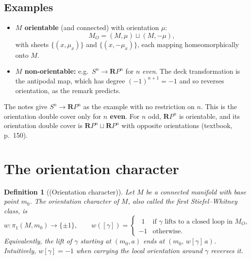 \documentclass[11pt]{article}
\newcommand{\RP}{\mathbf{R}P}
\newcommand{\MO}{M_O}
\theoremstyle{namedit}
\theoremstyle{namedrm}
\newtheorem{defn}{Definition}
\begin{document}
\subsection{Examples}
\begin{itemize}
  \item \textbf{$M$ orientable} (and connected) with orientation $\mu$:
        \[ \MO=(M,\mu)\sqcup(M,-\mu), \]
        with sheets $\{(x,\mu_x)\}$ and $\{(x,-\mu_x)\}$, each mapping homeomorphically onto $M$.
  \item \textbf{$M$ non-orientable:} e.g.\ $S^n\to\RP^n$ for $n$ \emph{even}. The deck transformation
        is the antipodal map, which has degree $(-1)^{n+1}=-1$ and so reverses orientation, as the
        remark predicts.
\end{itemize}

\begin{correction}[label=c:rpn]
The notes give $S^n\to\RP^n$ as the example with no restriction on $n$. This is the orientation
double cover only for \textbf{$n$ even}. For $n$ odd, $\RP^n$ is orientable, and its orientation double
cover is $\RP^n\sqcup\RP^n$ with opposite orientations (textbook, p.~150).
\end{correction}

\section{The orientation character}

\begin{defn}[(Orientation character)]
Let $M$ be a connected manifold with base point $m_0$. The \emph{orientation character} of $M$, also
called the \emph{first Stiefel--Whitney class}, is
\[
  w\colon\pi_1(M,m_0)\to\{\pm1\},\qquad
  w([\gamma])=
  \begin{cases}
    \ \ 1 & \text{if }\gamma\text{ lifts to a closed loop in }\MO,\\
    -1 & \text{otherwise.}
  \end{cases}
\]
Equivalently, the lift of $\gamma$ starting at $(m_0,a)$ ends at $(m_0,\,w[\gamma]\,a)$. Intuitively,
$w[\gamma]=-1$ when carrying the local orientation around $\gamma$ reverses it.
\end{defn}
\end{document}
